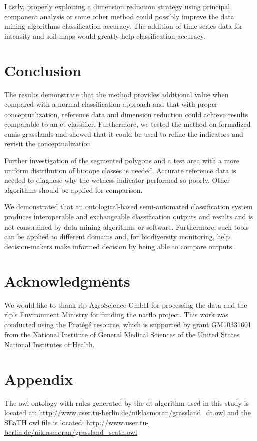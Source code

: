 \documentclass[authoryear,review,12pt,number]{elsarticle}
\begin{document}
Lastly, properly exploiting a dimension reduction strategy using principal 
component analysis or some other method could possibly improve the data mining 
algorithms classification accuracy. The addition of time series data for 
intensity and soil maps would greatly help classification accuracy.
\section{Conclusion}
The results demonstrate that the method provides additional value when compared 
with a normal classification approach and that with proper conceptualization, 
reference data and dimension reduction could achieve results comparable to an 
\gls{et} classifier. Furthermore, we tested the method on formalized 
\gls{eunis} grasslands and showed that it could be used to refine the 
indicators and revisit the conceptualization. 

Further investigation of the segmented polygons and a test area with a more
uniform distribution of biotope classes is needed. Accurate reference data is
needed to diagnose why the wetness indicator performed so poorly. Other 
algorithms should be applied for comparison.

We demonstrated that an ontological-based semi-automated classification system
produces interoperable and exchangeable classification outputs
and results and is not constrained by data mining
algorithms or software. Furthermore, such tools can be applied to different 
domains and, for biodiversity monitoring, help decision-makers make informed 
decision by being able to compare outputs.
\section{Acknowledgments}
We would like to thank \gls{rlp} AgroScience GmbH for processing the data and 
the \gls{rlp}'s Environment Ministry for funding the \gls{natflo} project. This 
work was conducted using the Prot\'eg\'e resource, which is supported by grant 
GM10331601 from the National Institute of General Medical Sciences of the 
United States National Institutes of Health.
\section{Appendix}
The \gls{owl} ontology with rules generated by the \gls{dt} algorithm used in 
this study is located at: 
\url{http://www.user.tu-berlin.de/niklasmoran/grassland_dt.owl} and the SEaTH 
\gls{owl} file is located: 
\url{http://www.user.tu-berlin.de/niklasmoran/grassland_seath.owl}

\end{document}
